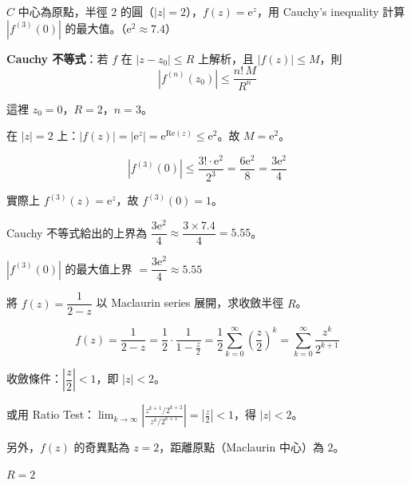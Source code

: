 \documentclass[12pt,a4paper]{article}
\newcommand{\ee}{\mathrm{e}}
\begin{document}
\begin{qbox}[第 4 題 (5-5)]
$C$ 中心為原點，半徑 $2$ 的圓（$|z|=2$），$f(z)=\ee^z$，用 Cauchy's inequality 計算 $|f^{(3)}(0)|$ 的最大值。（$\ee^2\approx 7.4$）
\end{qbox}

\begin{solbox}[解]
\textbf{Cauchy 不等式}：若 $f$ 在 $|z-z_0|\le R$ 上解析，且 $|f(z)|\le M$，則
$$|f^{(n)}(z_0)|\le\frac{n!\,M}{R^n}$$

這裡 $z_0=0$，$R=2$，$n=3$。

在 $|z|=2$ 上：$|f(z)|=|\ee^z|=\ee^{\text{Re}(z)}\le\ee^2$。故 $M=\ee^2$。

$$|f^{(3)}(0)|\le\frac{3!\cdot\ee^2}{2^3}=\frac{6\ee^2}{8}=\frac{3\ee^2}{4}$$

實際上 $f^{(3)}(z)=\ee^z$，故 $f^{(3)}(0)=1$。

Cauchy 不等式給出的上界為 $\dfrac{3\ee^2}{4}\approx\dfrac{3\times 7.4}{4}=5.55$。
\end{solbox}

\begin{ansbox}
$|f^{(3)}(0)|$ 的最大值上界 $=\boxed{\dfrac{3\ee^2}{4}\approx 5.55}$
\end{ansbox}

\begin{qbox}[第 5 題]
將 $f(z)=\dfrac{1}{2-z}$ 以 Maclaurin series 展開，求收斂半徑 $R$。
\end{qbox}

\begin{solbox}[解]
$$f(z)=\frac{1}{2-z}=\frac{1}{2}\cdot\frac{1}{1-\frac{z}{2}}=\frac{1}{2}\sum_{k=0}^{\infty}\left(\frac{z}{2}\right)^k=\sum_{k=0}^{\infty}\frac{z^k}{2^{k+1}}$$

收斂條件：$\left|\dfrac{z}{2}\right|<1$，即 $|z|<2$。

或用 Ratio Test：$\displaystyle\lim_{k\to\infty}\left|\frac{z^{k+1}/2^{k+2}}{z^k/2^{k+1}}\right|=\left|\frac{z}{2}\right|<1$，得 $|z|<2$。

另外，$f(z)$ 的奇異點為 $z=2$，距離原點（Maclaurin 中心）為 $2$。
\end{solbox}

\begin{ansbox}
$R=\boxed{2}$
\end{ansbox}
\end{document}

